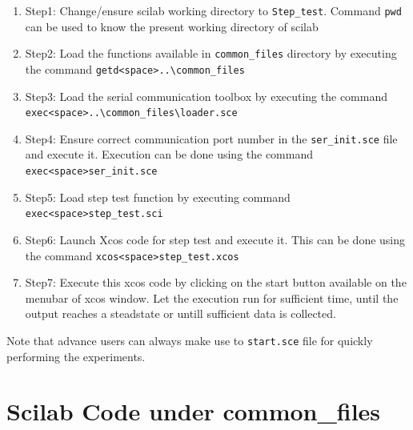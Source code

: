 \begin{enumerate}
\item Step1: Change/ensure scilab working directory to {\tt Step\_test}. Command {\tt pwd} can be used to know the present working directory of scilab
\item Step2: Load the functions available in {\tt common\_files} directory by executing the command {\tt getd<space>..\textbackslash common\_files\ }
\item Step3: Load the serial communication toolbox by executing the command {\tt exec<space>..\textbackslash common\_files\textbackslash loader.sce}
\item Step4: Ensure correct communication port number in the {\tt ser\_init.sce} file and execute it. Execution can be done using the command \\{\tt exec<space>ser\_init.sce}
\item Step5: Load step test function by executing command\\ {\tt exec<space>step\_test.sci}
\item Step6: Launch Xcos code for step test and execute it. This can be done using the command {\tt xcos<space>step\_test.xcos}
\item Step7: Execute this xcos code by clicking on the start button available on the menubar of xcos window. Let the execution run for sufficient time, until the output reaches a steadstate or untill sufficient data is collected.
\end{enumerate}

Note that advance users can always make use to {\tt start.sce} file for quickly performing the experiments.

\section{Scilab Code under common\_files}\label{commonfiles}
\begin{code}

\end{code}

\begin{code}

\end{code}

\begin{code}

\end{code}




